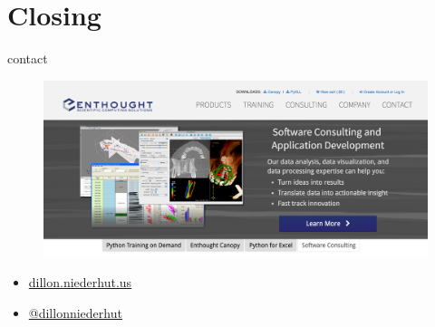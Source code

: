 \documentclass{beamer}
\begin{document}
\section{Closing}

\begin{frame}{contact}
    \begin{figure}
        \centering
        \includegraphics[width=\textwidth]{enthought.png}
    \end{figure}
\begin{itemize}
    \item \href{http://dillon.niederhut.us}{dillon.niederhut.us}
    \item \href{https://twitter.com/dillonniederhut}{@dillonniederhut}
\end{itemize}
\end{frame}
\end{document}
